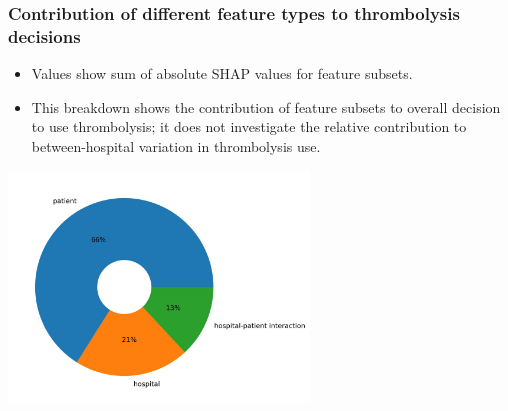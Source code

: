 \begin{frame}
\frametitle{Contribution of different feature types to thrombolysis decisions}

\small
\begin{itemize}
    \item Values show sum of absolute SHAP values for feature subsets.
    \item This breakdown shows the contribution of feature subsets to overall decision to use thrombolysis; it does not investigate the relative contribution to between-hospital variation in thrombolysis use.
\end{itemize}

\begin{center}
    \includegraphics[width=0.60\textwidth]{./images/03f_shap_contributions}
\end{center}

\end{frame}